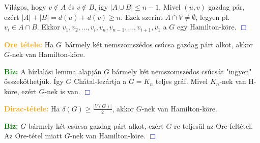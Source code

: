 \documentclass[../../szobeli.tex]{subfiles}
\begin{document}
\begin{itemize}
        Világos, hogy $v \notin A$ és $v \notin B$, így $|A \cup B| \leq n-1$. Mivel $(u,v)$ gazdag pár, ezért $|A|+|B| = d(u)+d(v) \geq n$. Ezek szerint $A \cap V \neq \emptyset$, legyen pl. $v_i \in A \cap B$. Ekkor $v_1, v_2, \dots, v_i, v_n, v_{n-1}, \dots, v_{i+1}, v_1$ a $G$ egy Hamilton-köre. \textcolor{blue}{$\Box$}

        \textcolor{orange}{\textbf{Ore tétele:}} Ha $G$ bármely két nemszomszédos csúcsa gazdag párt alkot, akkor $G$-nek van Hamilton-köre.

        \textcolor{green}{\textbf{Biz:}} A hízlalási lemma alapján $G$ bármely két nemszomszédos csúcsát "ingyen" összeköthetjük. Így $G$ Chátal-lezártja a $\overline{G} = K_n$ teljes gráf. Mivel $K_n$-nek van H-köre, ezért $G$-nek is van. \textcolor{blue}{$\Box$}

        \textcolor{orange}{\textbf{Dirac-tétele:}} Ha $\delta(G) \geq \frac{|V(G)|}{2}$, akkor $G$-nek van Hamilton-köre.

        \textcolor{green}{\textbf{Biz:}} $G$ bármely két csúcsa gazdag párt alkot, ezért $G$-re teljesül az Ore-feltétel. Az Ore-tétel miatt $G$-nek van Hamilton-köre. \textcolor{blue}{$\Box$}

    \end{itemize}
\end{document}
